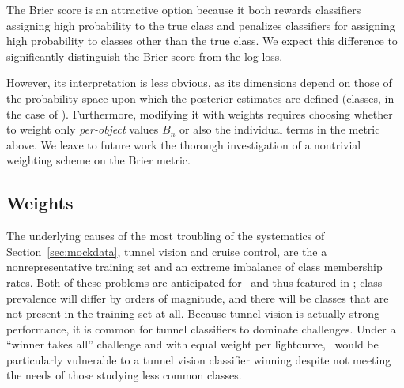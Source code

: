 The Brier score is an attractive option because it both rewards classifiers assigning high probability to the true class and penalizes classifiers for assigning high probability to classes other than the true class.
We expect this difference to significantly distinguish the Brier score from the log-loss.

However, its interpretation is less obvious, as its dimensions depend on those of the probability space upon which the posterior estimates are defined (classes, in the case of \plasticc).
Furthermore, modifying it with weights requires choosing whether to weight only \textit{per-object} values $B_{n}$ or also the individual terms in the metric above.
We leave to future work the thorough investigation of a nontrivial weighting scheme on the Brier metric.


%

\subsection{Weights}
\label{sec:weights}


The underlying causes of the most troubling of the systematics of Section~\ref{sec:mockdata}, tunnel vision and cruise control, are the a nonrepresentative training set and an extreme imbalance of class membership rates.
Both of these problems are anticipated for \lsst\ and thus featured in \plasticc; class prevalence will differ by orders of magnitude, and there will be classes that are not present in the training set at all.
Because tunnel vision is actually strong performance, it is common for tunnel classifiers to dominate challenges.
Under a ``winner takes all'' challenge and with equal weight per lightcurve, \plasticc\ would be particularly vulnerable to a tunnel vision classifier winning despite not meeting the needs of those studying less common classes.

